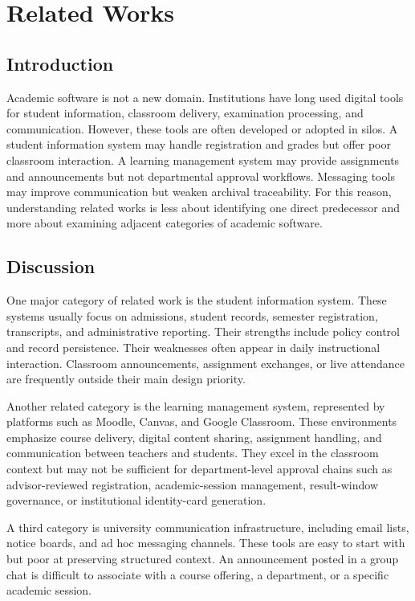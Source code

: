 \documentclass[12pt,a4paper]{report}
\begin{document}
\chapter{Related Works}

\section{Introduction}
Academic software is not a new domain. Institutions have long used digital tools for student information, classroom delivery, examination processing, and communication. However, these tools are often developed or adopted in silos. A student information system may handle registration and grades but offer poor classroom interaction. A learning management system may provide assignments and announcements but not departmental approval workflows. Messaging tools may improve communication but weaken archival traceability. For this reason, understanding related works is less about identifying one direct predecessor and more about examining adjacent categories of academic software.

\section{Discussion}
One major category of related work is the student information system. These systems usually focus on admissions, student records, semester registration, transcripts, and administrative reporting. Their strengths include policy control and record persistence. Their weaknesses often appear in daily instructional interaction. Classroom announcements, assignment exchanges, or live attendance are frequently outside their main design priority.

Another related category is the learning management system, represented by platforms such as Moodle, Canvas, and Google Classroom. These environments emphasize course delivery, digital content sharing, assignment handling, and communication between teachers and students. They excel in the classroom context but may not be sufficient for department-level approval chains such as advisor-reviewed registration, academic-session management, result-window governance, or institutional identity-card generation.

A third category is university communication infrastructure, including email lists, notice boards, and ad hoc messaging channels. These tools are easy to start with but poor at preserving structured context. An announcement posted in a group chat is difficult to associate with a course offering, a department, or a specific academic session.
\end{document}
